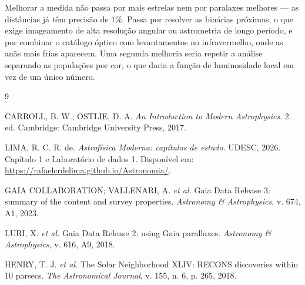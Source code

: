\documentclass[10pt,a4paper,twocolumn]{article}
\begin{document}
Melhorar a medida não passa por mais estrelas nem por paralaxes melhores
--- as distâncias já têm precisão de $1\%$. Passa por resolver as
binárias próximas, o que exige imageamento de alta resolução angular ou
astrometria de longo período, e por combinar o catálogo óptico com
levantamentos no infravermelho, onde as anãs mais frias aparecem. Uma
segunda melhoria seria repetir a análise separando as populações por cor,
o que daria a função de luminosidade local em vez de um único número.

\begin{thebibliography}{9}
\small

CARROLL, B. W.; OSTLIE, D. A.
\textit{An Introduction to Modern Astrophysics}.
2. ed. Cambridge: Cambridge University Press, 2017.

LIMA, R. C. R. de.
\textit{Astrofísica Moderna: capítulos de estudo}.
UDESC, 2026. Capítulo 1 e Laboratório de dados 1. Disponível em:
\url{https://rafaelcrdelima.github.io/Astronomia/}.

GAIA COLLABORATION; VALLENARI, A. \textit{et al.}
Gaia Data Release 3: summary of the content and survey properties.
\textit{Astronomy \& Astrophysics}, v. 674, A1, 2023.

LURI, X. \textit{et al.}
Gaia Data Release 2: using Gaia parallaxes.
\textit{Astronomy \& Astrophysics}, v. 616, A9, 2018.

HENRY, T. J. \textit{et al.}
The Solar Neighborhood XLIV: RECONS discoveries within 10 parsecs.
\textit{The Astronomical Journal}, v. 155, n. 6, p. 265, 2018.

\end{thebibliography}
\end{document}
